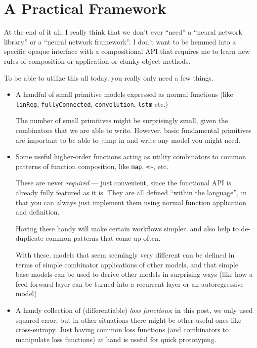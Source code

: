 \documentclass[]{article}
\begin{document}
\hypertarget{a-practical-framework}{%
\section{A Practical Framework}\label{a-practical-framework}}

At the end of it all, I really think that we don't ever ``need'' a ``neural
network library'' or a ``neural network framework''. I don't want to be hemmed
into a specific opaque interface with a compositional API that requires me to
learn new rules of composition or application or clunky object methods.

To be able to utilize this all today, you really only need a few things.

\begin{itemize}
\item
  A handful of small primitive models expressed as normal functions (like
  \texttt{linReg}, \texttt{fullyConnected}, \texttt{convolution}, \texttt{lstm}
  etc.)

  The number of small primitives might be surprisingly small, given the
  combinators that we are able to write. However, basic fundamental primitives
  are important to be able to jump in and write any model you might need.
\item
  Some useful higher-order functions acting as utility combinators to common
  patterns of function composition, like \texttt{map},
  \texttt{\textless{}\textasciitilde{}}, etc.

  These are never \emph{required} --- just convenient, since the functional API
  is already fully featured as it is. They are all defined ``within the
  language'', in that you can always just implement them using normal function
  application and definition.

  Having these handy will make certain workflows simpler, and also help to
  de-duplicate common patterns that come up often.

  With these, models that seem seemingly very different can be defined in terms
  of simple combinator applications of other models, and that simple base models
  can be used to derive other models in surprising ways (like how a feed-forward
  layer can be turned into a recurrent layer or an autoregressive model)
\item
  A handy collection of (differentiable) \emph{loss functions}; in this post, we
  only used squared error, but in other situations there might be other useful
  ones like cross-entropy. Just having common loss functions (and combinators to
  manipulate loss functions) at hand is useful for quick prototyping.


\end{itemize}
\end{document}
